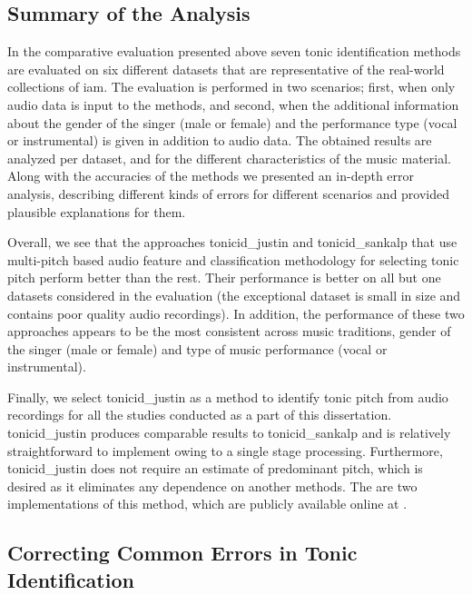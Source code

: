 {{\subsection{Summary of the Analysis }
\label{sec:pre_processing_tonic_identification_summary}

In the comparative evaluation presented above seven tonic identification methods are evaluated on six different datasets that are representative of the real-world collections of \gls{iam}. The evaluation is performed in two scenarios; first, when only audio data is input to the methods, and second, when the additional information about the gender of the singer (male or female) and  the performance type (vocal or instrumental) is given in addition to audio data. The obtained results are analyzed per dataset, and for the different characteristics of the music material. Along with the accuracies of the methods we presented an in-depth error analysis, describing different kinds of errors for different scenarios and provided plausible explanations for them.

Overall, we see that the approaches \acrshort{tonicid_justin} and \acrshort{tonicid_sankalp} that use multi-pitch based audio feature and classification methodology for selecting tonic pitch perform better than the rest. Their performance is better on all but one datasets considered in the evaluation (the exceptional dataset is small in size and contains poor quality audio recordings). In addition, the performance of these two approaches appears to be the most consistent across music traditions, gender of the singer (male or female) and type of music performance (vocal or instrumental). 

Finally, we select \acrshort{tonicid_justin} as a method to identify tonic pitch from audio recordings for all the studies conducted as a part of this dissertation. \acrshort{tonicid_justin} produces comparable results to \acrshort{tonicid_sankalp} and is relatively straightforward to implement owing to a single stage processing. Furthermore, \acrshort{tonicid_justin} does not require an estimate of predominant pitch, which is desired as it eliminates any dependence on another methods. The are two implementations of this method, which are publicly available online at . 


\subsection{Correcting Common Errors in Tonic Identification}
\label{sec:pre_processing_tonic_identification_correcting_errors}

}}
